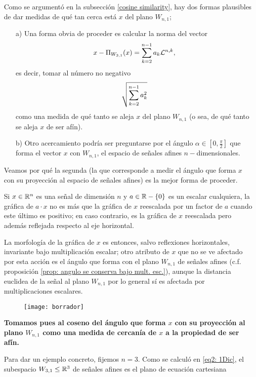 {Como se argumentó en la subsección \ref{cosine similarity}, hay
dos formas plausibles de dar medidas de qué tan cerca está
$x$ del plano $W_{n,1}$;

\begin{itemize}
\item[a)] Una forma obvia de proceder es calcular la norma
del vector 
\[
x - \Pi_{W_{3,1}}(x)= \sum\limits_{k=2}^{n-1}a_{k} \mathcal{L}^{n, k},
\]
es decir, tomar al número no negativo
\[
\sqrt{ \sum\limits_{k=2}^{n-1}a_{k}^{2}}
\]
como una medida de qué tanto se aleja $x$ del plano $W_{n,1}$
(o sea, de qué tanto se aleja $x$ de ser afín).

\item[b)] Otro acercamiento podría ser preguntarse por
el ángulo $\alpha \in [0, \frac{\pi}{2}]$ 
que forma el vector $x$ con
$W_{n,1}$, el espacio de señales afines $n-$dimensionales.
\end{itemize}
Veamos por qué la segunda (la que corresponde a medir
el ángulo que forma $x$ con su proyección al espacio de señales afines)
es la mejor forma de proceder.

Si $x \in \mathbb{R}^{n}$ es una señal de dimensión $n$ y 
$a \in \mathbb{R}-\{ 0 \}$ es un escalar cualquiera,
la gráfica de $a \cdot x$ no es más que la gráfica 
de $x$ reescalada por un factor de $a$ cuando este
último es positivo; en caso contrario, es la gráfica
de $x$ reescalada pero además reflejada respecto al eje
horizontal.

La morfología de la gráfica de $x$ es entonces,
salvo reflexiones horizontales, invariante bajo multiplicación
escalar; otro atributo de $x$ que no se ve afectado por esta acción
es el ángulo que forma con el plano $W_{n,1}$ de señales afines
(c.f. proposición \ref{prop: angulo se conserva bajo mult. esc.}), 
aunque la distancia euclidea de la señal
al plano $W_{n,1}$ por lo general sí es afectada por multiplicaciones escalares.


\begin{figure}[H]
	\centering
	\texttt{[image: borrador]}
\end{figure}

\textbf{Tomamos pues al coseno del ángulo que forma $x$ con su proyección
al plano $W_{n,1}$ como una medida de cercanía de $x$ a la propiedad de 
ser afín.}


Para dar un ejemplo concreto, fijemos $n=3$.
Como se calculó en \eqref{eq2: 1Dic},
el subespacio $W_{3,1} \leq \mathbb{R}^{3}$ de señales afines es el plano
de ecuación cartesiana

}

